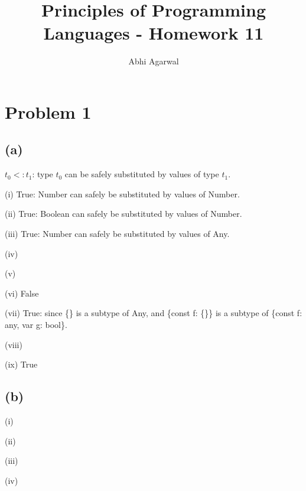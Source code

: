 \documentclass[11pt, oneside]{article}
\title{Principles of Programming Languages - Homework 11}
\author{Abhi Agarwal}
\date{}
\begin{document}
\maketitle
\section{Problem 1}
\subsection*{(a)} 

\indent \par $t_0 <: t_1$: type $t_0$ can be safely substituted by values of type $t_1$.
\par (i) True: Number can safely be substituted by values of Number.
\par (ii) True: Boolean can safely be substituted by values of Number. 
\par (iii) True: Number can safely be substituted by values of Any.
\par (iv) 
\par (v) 
\par (vi) False
\par (vii) True: since \{\} is a subtype of Any, and \{const f: \{\}\} is a subtype of \{const f: any, var g: bool\}.
\par (viii) 
\par (ix) True

\subsection*{(b)} 
\par (i) 
\par (ii)  
\par (iii) 
\par (iv) 
\end{document}
